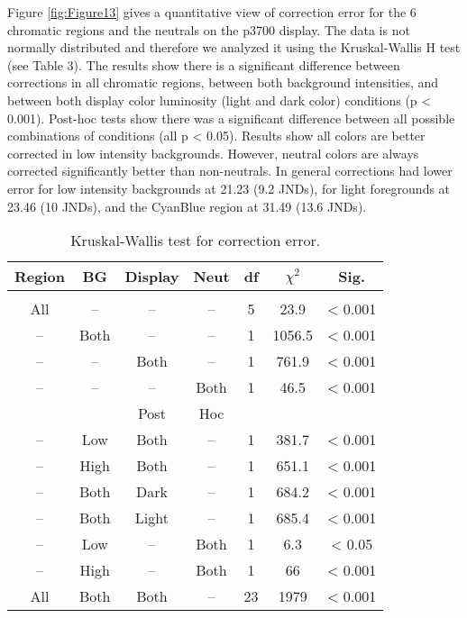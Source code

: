 \documentclass[annual]{acmsiggraph}
\begin{document}
Figure \ref{fig:Figure13} gives a quantitative view of correction error for the 6 chromatic regions and the neutrals on the p3700 display. The data is not normally distributed and therefore we analyzed it using the Kruskal-Wallis H test (see Table 3). The results show there is a significant difference between corrections in all chromatic regions, between both background intensities, and between both display color luminosity (light and dark color) conditions (p < 0.001). Post-hoc tests show there was a significant difference between all possible combinations of conditions (all p < 0.05). Results show all colors are better corrected in low intensity backgrounds. However, neutral colors are always corrected significantly better than non-neutrals. In general corrections had lower error for low intensity backgrounds at 21.23 (9.2 JNDs), for light foregrounds at 23.46 (10 JNDs), and the CyanBlue region at 31.49 (13.6 JNDs).
\begin{table}[ht]
\caption{Kruskal-Wallis test for correction error.} %
\centering %
\begin{tabular}{c c c c c c c} %
\hline\hline %
Region&BG&Display&Neut&df&$\chi^2$ &Sig.\\   %
\hline\hline\\  %
All&--&--&--&5&23.9&< 0.001\\
--&Both&--&--&1&1056.5&< 0.001\\
--&--&Both&--&1&761.9&< 0.001\\
--&--&--&Both&1&46.5&< 0.001\\
\hline %
&&Post&Hoc&\\
\hline
--&Low&Both&--&1&381.7&< 0.001\\
--&High&Both&--&1&651.1&< 0.001\\
--&Both&Dark&--&1&684.2&< 0.001\\
--&Both&Light&--&1&685.4&< 0.001\\
--&Low&--&Both&1&6.3&< 0.05\\
--&High&--&Both&1&66&< 0.001\\
All&Both&Both&--&23&1979&< 0.001\\
\hline
\end{tabular}
\label{table:3} %
\end{table}
\end{document}
